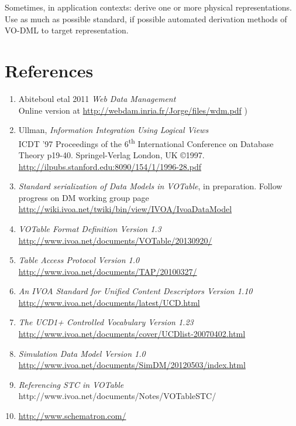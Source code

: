 \documentclass[10pt,a4paper]{ivoa}
\begin{document}
Sometimes, in application contexts: derive one or more physical
representations. Use as much as possible standard, if possible automated
derivation methods of VO-DML to target representation.

\hypertarget{references}{%
\section{References}\label{references}}

\begin{enumerate}
\def\labelenumi{\arabic{enumi}.}
\item
  Abiteboul etal 2011 \emph{Web Data Management}\\
  Online version at \url{http://webdam.inria.fr/Jorge/files/wdm.pdf} )
\item
  Ullman, \emph{Information Integration Using Logical Views\\
  }ICDT '97 Proceedings of the 6\textsuperscript{th} International
  Conference on Database Theory p19-40. Springel-Verlag London, UK
  ©1997. \url{http://ilpubs.stanford.edu:8090/154/1/1996-28.pdf}
\item
  \emph{Standard serialization of Data Models in VOTable}, in
  preparation. Follow progress on DM working group page
  \url{http://wiki.ivoa.net/twiki/bin/view/IVOA/IvoaDataModel}
\item
  \emph{VOTable Format Definition Version 1.3}\\
  \url{http://www.ivoa.net/documents/VOTable/20130920/}
\item
  \emph{Table Access Protocol Version 1.0}\\
  \url{http://www.ivoa.net/documents/TAP/20100327/}
\item
  \emph{An IVOA Standard for Unified Content Descriptors Version 1.10\\
  }\url{http://www.ivoa.net/documents/latest/UCD.html}
\item
  \emph{The UCD1+ Controlled Vocabulary Version 1.23\\
  }\url{http://www.ivoa.net/documents/cover/UCDlist-20070402.html}
\item
  \emph{Simulation Data Model Version 1.0}\\
  \url{http://www.ivoa.net/documents/SimDM/20120503/index.html}
\item
  \emph{Referencing STC in VOTable\\
  }http://www.ivoa.net/documents/Notes/VOTableSTC/
\item
  \url{http://www.schematron.com/}

\end{enumerate}
\end{document}
